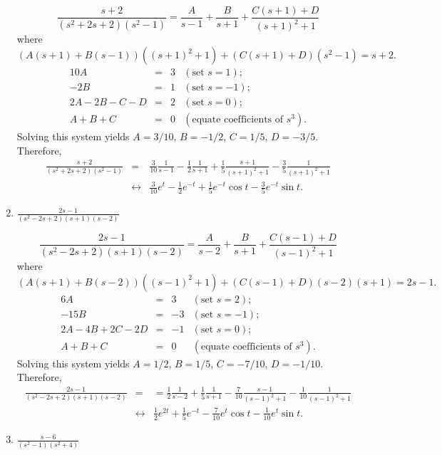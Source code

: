 \documentclass{ximera}
\begin{document}
\begin{problem}
\begin{enumerate}
\begin{solution}
$$
\frac{s+2}{(s^2+2s+2)(s^2-1)}
=\frac{A}{s-1}+\frac{B}{s+1}+\frac{C(s+1)+D}{(s+1)^2+1}
$$
where
$$
(A(s+1)+B(s-1))((s+1)^2+1)+(C(s+1)+D)(s^2-1)=s+2.
$$
$$
\begin{array}{rcrl}
10A&=&3&(\mbox{set }s=1);\\
-2B&=&1& (\mbox{set }s=-1);\\
2A-2B-C-D&=&2& (\mbox{set }s=0);\\
A+B+C&=&0&(\mbox{equate coefficients of }s^3).
\end{array}
$$
Solving this system yields $A=3/10$, $B=-1/2$,
$C=1/5$, $D=-3/5$. Therefore,
\begin{eqnarray*}
\frac{s+2}{(s^2+2s+2)(s^2-1)}
&=&
\frac{3}{10}\frac{1}{s-1}-\frac{1}{2}\frac{1}{s+1}+\frac{1}{5}\frac{s+1}{(s+1)^2+1}
-\frac{3}{5}\frac{1}{(s+1)^2+1}
\\&\leftrightarrow&
\frac{3}{10}e^{t}-\frac{1}{2}e^{-t}
+\frac{1}{5}e^{-t}\cos t-\frac{3}{5}e^{-t}\sin t.
\end{eqnarray*}
\end{solution}

\item $\frac{2s-1}{(s^2-2s+2)(s+1)(s-2)}$

\begin{solution}
$$
\frac{2s-1}{(s^2-2s+2)(s+1)(s-2)}
=\frac{A}{s-2}+\frac{B}{s+1}+\frac{C(s-1)+D}{(s-1)^2+1}
$$
where
$$
(A(s+1)+B(s-2))((s-1)^2+1)+(C(s-1)+D)(s-2)(s+1)=2s-1.
$$
$$
\begin{array}{rcrl}
6A&=&3&(\mbox{set }s=2);\\
-15B&=&-3& (\mbox{set }s=-1);\\
2A-4B+2C-2D&=&-1& (\mbox{set }s=0);\\
A+B+C&=&0&(\mbox{equate coefficients of }s^3).
\end{array}
$$
Solving this system yields $A=1/2$, $B=1/5$,
$C=-7/10$, $D=-1/10$. Therefore,
\begin{eqnarray*}
\frac{2s-1}{(s^2-2s+2)(s+1)(s-2)}
&=&
=\frac{1}{2}\frac{1}{s-2}+\frac{1}{5}\frac{1}{s+1}-\frac{7}{10}\frac{s-1}{(s-1)^2+1}
-\frac{1}{10}\frac{1}{(s-1)^2+1}
\\&\leftrightarrow&
\frac{1}{2}e^{2t}+\frac{1}{5} e^{-t}
-\frac{7}{10}e^t\cos t-\frac{1}{10}e^t\sin t.
\end{eqnarray*}
\end{solution}

\item $\frac{s-6}{(s^2-1)(s^2+4)}$


\end{enumerate}
\end{problem}
\end{document}
